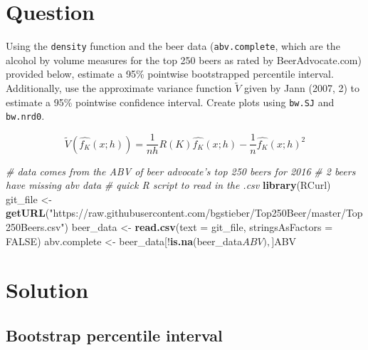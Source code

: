 \documentclass[]{article}
\newenvironment{Shaded}{\begin{snugshade}}{\end{snugshade}}
\newcommand{\KeywordTok}[1]{\textcolor[rgb]{0.13,0.29,0.53}{\textbf{{#1}}}}
\newcommand{\DataTypeTok}[1]{\textcolor[rgb]{0.13,0.29,0.53}{{#1}}}
\newcommand{\StringTok}[1]{\textcolor[rgb]{0.31,0.60,0.02}{{#1}}}
\newcommand{\CommentTok}[1]{\textcolor[rgb]{0.56,0.35,0.01}{\textit{{#1}}}}
\newcommand{\OtherTok}[1]{\textcolor[rgb]{0.56,0.35,0.01}{{#1}}}
\newcommand{\NormalTok}[1]{{#1}}
\begin{document}
\section{Question}\label{question}

Using the \texttt{density} function and the beer data
(\texttt{abv.complete}, which are the alcohol by volume measures for the
top 250 beers as rated by BeerAdvocate.com) provided below, estimate a
95\% pointwise bootstrapped percentile interval. Additionally, use the
approximate variance function \(\tilde{V}\) given by Jann (2007, 2) to
estimate a 95\% pointwise confidence interval. Create plots using
\texttt{bw.SJ} and \texttt{bw.nrd0}.

\[\tilde{V}\left(\widehat{f_K}(x;h)\right) = \frac{1}{nh}R(K) \widehat{f_K}(x;h) - \frac{1}{n} \widehat{f_K}(x;h)^2\]

\begin{Shaded}
\begin{Highlighting}[]
\CommentTok{# data comes from the ABV of beer advocate's top 250 beers for 2016}
\CommentTok{# 2 beers have missing abv data}
\CommentTok{# quick R script to read in the .csv}
\KeywordTok{library}\NormalTok{(RCurl)}
\NormalTok{git_file <-}\StringTok{ }
\KeywordTok{getURL}\NormalTok{(}\StringTok{"https://raw.githubusercontent.com/bgstieber/Top250Beer/master/Top250Beers.csv"}\NormalTok{)}
\NormalTok{beer_data <-}\StringTok{ }\KeywordTok{read.csv}\NormalTok{(}\DataTypeTok{text =} \NormalTok{git_file, }\DataTypeTok{stringsAsFactors =} \OtherTok{FALSE}\NormalTok{)}
\NormalTok{abv.complete <-}\StringTok{ }\NormalTok{beer_data[!}\KeywordTok{is.na}\NormalTok{(beer_data$ABV), ]$ABV}
\end{Highlighting}
\end{Shaded}

\section{Solution}\label{solution}

\subsection{Bootstrap percentile
interval}\label{bootstrap-percentile-interval}
\end{document}
